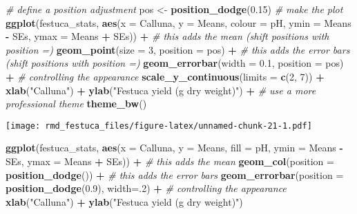 \documentclass[
]{article}
\newenvironment{Shaded}{\begin{snugshade}}{\end{snugshade}}
\newcommand{\AttributeTok}[1]{\textcolor[rgb]{0.13,0.29,0.53}{#1}}
\newcommand{\CommentTok}[1]{\textcolor[rgb]{0.56,0.35,0.01}{\textit{#1}}}
\newcommand{\DecValTok}[1]{\textcolor[rgb]{0.00,0.00,0.81}{#1}}
\newcommand{\FloatTok}[1]{\textcolor[rgb]{0.00,0.00,0.81}{#1}}
\newcommand{\FunctionTok}[1]{\textcolor[rgb]{0.13,0.29,0.53}{\textbf{#1}}}
\newcommand{\NormalTok}[1]{#1}
\newcommand{\OtherTok}[1]{\textcolor[rgb]{0.56,0.35,0.01}{#1}}
\newcommand{\SpecialCharTok}[1]{\textcolor[rgb]{0.81,0.36,0.00}{\textbf{#1}}}
\newcommand{\StringTok}[1]{\textcolor[rgb]{0.31,0.60,0.02}{#1}}
\begin{document}
\begin{Shaded}
\begin{Highlighting}[]
\CommentTok{\# define a position adjustment }
\NormalTok{pos }\OtherTok{\textless{}{-}} \FunctionTok{position\_dodge}\NormalTok{(}\FloatTok{0.15}\NormalTok{)}
\CommentTok{\# make the plot}
\FunctionTok{ggplot}\NormalTok{(festuca\_stats, }
       \FunctionTok{aes}\NormalTok{(}\AttributeTok{x =}\NormalTok{ Calluna, }\AttributeTok{y =}\NormalTok{ Means, }\AttributeTok{colour =}\NormalTok{ pH,}
           \AttributeTok{ymin =}\NormalTok{ Means }\SpecialCharTok{{-}}\NormalTok{ SEs, }\AttributeTok{ymax =}\NormalTok{ Means }\SpecialCharTok{+}\NormalTok{ SEs)) }\SpecialCharTok{+}
  \CommentTok{\# this adds the mean (shift positions with \textquotesingle{}position =\textquotesingle{})}
  \FunctionTok{geom\_point}\NormalTok{(}\AttributeTok{size =} \DecValTok{3}\NormalTok{, }\AttributeTok{position =}\NormalTok{ pos) }\SpecialCharTok{+}
  \CommentTok{\# this adds the error bars (shift positions with \textquotesingle{}position =\textquotesingle{})}
  \FunctionTok{geom\_errorbar}\NormalTok{(}\AttributeTok{width =} \FloatTok{0.1}\NormalTok{, }\AttributeTok{position =}\NormalTok{ pos) }\SpecialCharTok{+}
  \CommentTok{\# controlling the appearance}
  \FunctionTok{scale\_y\_continuous}\NormalTok{(}\AttributeTok{limits =} \FunctionTok{c}\NormalTok{(}\DecValTok{2}\NormalTok{, }\DecValTok{7}\NormalTok{)) }\SpecialCharTok{+} 
  \FunctionTok{xlab}\NormalTok{(}\StringTok{"Calluna"}\NormalTok{) }\SpecialCharTok{+} \FunctionTok{ylab}\NormalTok{(}\StringTok{"Festuca yield (g dry weight)"}\NormalTok{) }\SpecialCharTok{+} 
  \CommentTok{\# use a more professional theme}
  \FunctionTok{theme\_bw}\NormalTok{()}
\end{Highlighting}
\end{Shaded}

\texttt{[image: rmd\_festuca\_files/figure-latex/unnamed-chunk-21-1.pdf]}

\begin{Shaded}
\begin{Highlighting}[]
\FunctionTok{ggplot}\NormalTok{(festuca\_stats, }
       \FunctionTok{aes}\NormalTok{(}\AttributeTok{x =}\NormalTok{ Calluna, }\AttributeTok{y =}\NormalTok{ Means, }\AttributeTok{fill =}\NormalTok{ pH,}
           \AttributeTok{ymin =}\NormalTok{ Means }\SpecialCharTok{{-}}\NormalTok{ SEs, }\AttributeTok{ymax =}\NormalTok{ Means }\SpecialCharTok{+}\NormalTok{ SEs)) }\SpecialCharTok{+}
  \CommentTok{\# this adds the mean}
  \FunctionTok{geom\_col}\NormalTok{(}\AttributeTok{position =} \FunctionTok{position\_dodge}\NormalTok{()) }\SpecialCharTok{+}
  \CommentTok{\# this adds the error bars}
  \FunctionTok{geom\_errorbar}\NormalTok{(}\AttributeTok{position =} \FunctionTok{position\_dodge}\NormalTok{(}\FloatTok{0.9}\NormalTok{), }\AttributeTok{width=}\NormalTok{.}\DecValTok{2}\NormalTok{) }\SpecialCharTok{+}
  \CommentTok{\# controlling the appearance}
  \FunctionTok{xlab}\NormalTok{(}\StringTok{"Calluna"}\NormalTok{) }\SpecialCharTok{+} \FunctionTok{ylab}\NormalTok{(}\StringTok{"Festuca yield (g dry weight)"}\NormalTok{)}
\end{Highlighting}
\end{Shaded}
\end{document}
